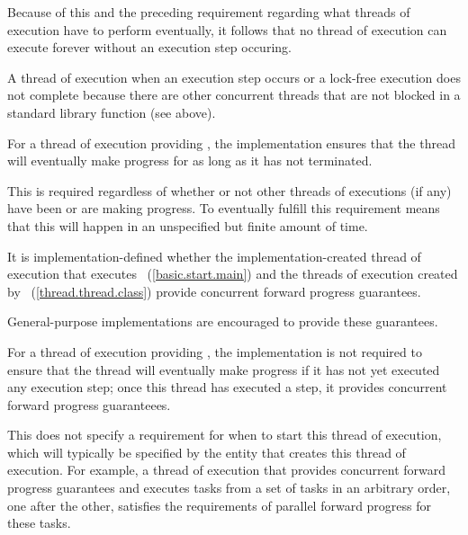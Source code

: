 \pnum
\begin{note}
Because of this and the preceding requirement regarding what threads of execution
have to perform eventually, it follows that no thread of execution can execute
forever without an execution step occuring.
\end{note}

\pnum
A thread of execution 
when an execution step occurs or a
lock-free execution does not complete because there are other concurrent threads
that are not blocked in a standard library function (see above).

\pnum
{}%
For a thread of execution providing ,
the implementation ensures that the thread will eventually make progress for as
long as it has not terminated.
\begin{note}
This is required regardless of whether or not other threads of executions (if any)
have been or are making progress. To eventually fulfill this requirement means that
this will happen in an unspecified but finite amount of time.
\end{note}

\pnum
It is implementation-defined whether the implementation-created thread of execution
that executes ~(\ref{basic.start.main}) and the threads of execution
created by ~(\ref{thread.thread.class}) provide concurrent forward
progress guarantees.
\begin{note}
General-purpose implementations are encouraged to provide these guarantees.
\end{note}

\pnum
{}%
For a thread of execution providing ,
the implementation is not required to ensure that the thread will eventually make
progress if it has not yet executed any execution step; once this thread has
executed a step, it provides concurrent forward progress guaranteees.

\pnum
\begin{note}
This does not specify a requirement for when to start this thread of execution,
which will typically be specified by the entity that creates this thread of
execution. For example, a thread of execution that provides concurrent forward
progress guarantees and executes tasks from a set of tasks in an arbitrary order,
one after the other, satisfies the requirements of parallel forward progress for
these tasks.
\end{note}

